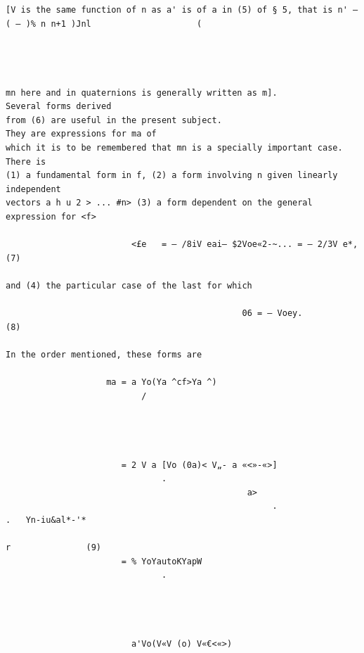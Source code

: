 \documentclass[10pt]{article}
\begin{document}
\begin{verbatim}
[V is the same function of n as a' is of a in (5) of § 5, that is n' — ( — )% n n+1 )Jnl                     (




mn here and in quaternions is generally written as m].                                  Several forms derived
from (6) are useful in the present subject.                         They are expressions for ma of
which it is to be remembered that mn is a specially important case.                                         There is
(1) a fundamental form in f, (2) a form involving n given linearly independent
vectors a h u 2 > ... #n> (3) a form dependent on the general expression for <f>

                         <£e   = — /8iV eai— $2Voe«2-~... = — 2/3V e*,                                            (7)

and (4) the particular case of the last for which

                                               06 = — Voey.                                                       (8)

In the order mentioned, these forms are

                    ma = a Yo(Ya ^cf>Ya ^)
                           /




                       = 2 V a [Vo (0a)< V„- a «<»-«>]
                               .
                                                a>
                                                     .                  .   Yn-iu&al*-'*
                                                                                                  r               (9)
                       = % YoYautoKYapW
                               .




                         a'Vo(V«V (o) V«€<«>)


\end{verbatim}
\clearpage
\end{document}
